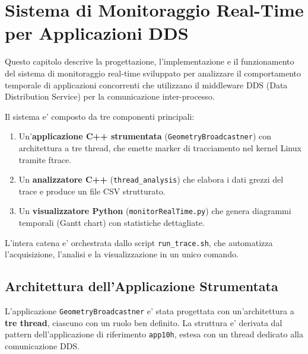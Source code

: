 
\chapter{Sistema di Monitoraggio Real-Time per Applicazioni DDS}
\label{ch:monitoraggio}

Questo capitolo descrive la progettazione, l'implementazione e il funzionamento
del sistema di monitoraggio real-time sviluppato per analizzare il comportamento
temporale di applicazioni concorrenti che utilizzano il middleware
DDS (Data Distribution Service) per la comunicazione inter-processo.

Il sistema e' composto da tre componenti principali:
\begin{enumerate}
    \item Un'\textbf{applicazione C++ strumentata} (\texttt{GeometryBroadcastner})
          con architettura a tre thread, che emette marker di tracciamento
          nel kernel Linux tramite ftrace.
    \item Un \textbf{analizzatore C++} (\texttt{thread\_analysis}) che elabora
          i dati grezzi del trace e produce un file CSV strutturato.
    \item Un \textbf{visualizzatore Python} (\texttt{monitorRealTime.py}) che
          genera diagrammi temporali (Gantt chart) con statistiche dettagliate.
\end{enumerate}

L'intera catena e' orchestrata dallo script \texttt{run\_trace.sh}, che automatizza
l'acquisizione, l'analisi e la visualizzazione in un unico comando.


\section{Architettura dell'Applicazione Strumentata}
\label{sec:architettura}

L'applicazione \texttt{GeometryBroadcastner} e' stata progettata con
un'architettura a \textbf{tre thread}, ciascuno con un ruolo ben definito.
La struttura e' derivata dal pattern dell'applicazione di riferimento
\texttt{app10h}, estesa con un thread dedicato alla comunicazione DDS.

